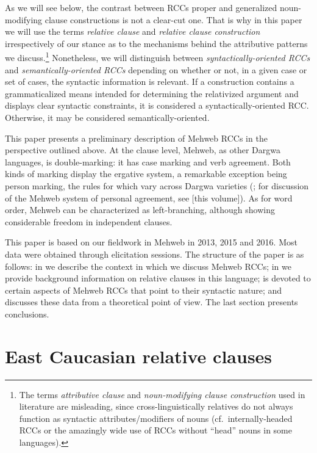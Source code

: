 ﻿\documentclass[output=paper]{langsci/langscibook}
\begin{document}
As we will see below, the contrast between RCCs proper and generalized
noun-modifying clause constructions is not a clear-cut one. That is why
in this paper we will use the terms \emph{relative clause} and
\emph{relative clause construction} irrespectively of our stance as to
the mechanisms behind the attributive patterns we discuss.\footnote{The
  terms \emph{attributive clause} and \emph{noun-modifying clause
  construction} used in literature are misleading, since
  cross-linguistically relatives do not always function as syntactic
  attributes/modifiers of nouns (cf.\ internally-headed RCCs or the
  amazingly wide use of RCCs without ``head'' nouns in some languages).}
Nonetheless, we will distinguish between \emph{syntactically-oriented
RCCs} and \emph{semantically-oriented RCCs} depending on whether or not,
in a given case or set of cases, the syntactic information is relevant.
If a construction contains a grammaticalized means intended for
determining the relativized argument and displays clear syntactic
constraints, it is considered a syntactically-oriented RCC. Otherwise,
it may be considered semantically-oriented.


This paper presents a preliminary description of Mehweb RCCs in the
perspective outlined above. At the clause level, Mehweb, as other Dargwa
languages, is double-marking: it has case marking and verb agreement.
Both kinds of marking display the ergative system, a remarkable
exception being person marking, the rules for which vary across Dargwa
varieties (\citealt{sumbatova2011}; for discussion of the Mehweb system of
personal agreement, see \citealt{ganenkov2019} [this volume]). As for word order, Mehweb
can be characterized as left-branching, although showing considerable
freedom in independent clauses.


This paper is based on our fieldwork in Mehweb in 2013, 2015 and 2016.
Most data were obtained through elicitation sessions. The structure of
the paper is as follows: in  we describe the context in which
we discuss Mehweb RCCs; in  we provide background information
on relative clauses in this language;  is devoted to certain
aspects of Mehweb RCCs that point to their syntactic nature; and
 discusses these data from a theoretical point of view. The last
section presents conclusions.

\section{East Caucasian relative clauses}\label{east-caucasian-relative-clauses}
\end{document}
